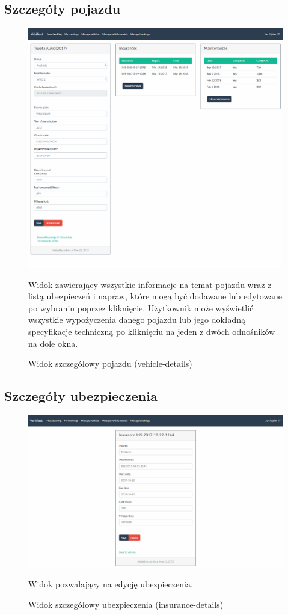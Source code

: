 \documentclass[eng,printmode,openany]{mgr}
\begin{document}
\subsection{Szczegóły pojazdu}
\begin{figure}[H]
	\centering
	\includegraphics[width=\textwidth]{images/views/vehicle-detail.png}
	\caption{Widok szczegółowy pojazdu (vehicle-details)}
	\small 
	Widok zawierający wszystkie informacje na temat pojazdu wraz z listą ubezpieczeń i napraw, które mogą być dodawane lub edytowane po wybraniu poprzez kliknięcie. Użytkownik może wyświetlić wszystkie wypożyczenia danego pojazdu lub jego dokładną specyfikacje techniczną po kliknięciu na jeden z dwóch odnośników na dole okna.
\end{figure}

\subsection{Szczegóły ubezpieczenia}
\begin{figure}[H]
	\centering
	\includegraphics[width=\textwidth]{images/views/insurance-detail.png}
	\caption{Widok szczegółowy ubezpieczenia (insurance-details)}
	\small 
	Widok pozwalający na edycję ubezpieczenia.
\end{figure}
\end{document}
